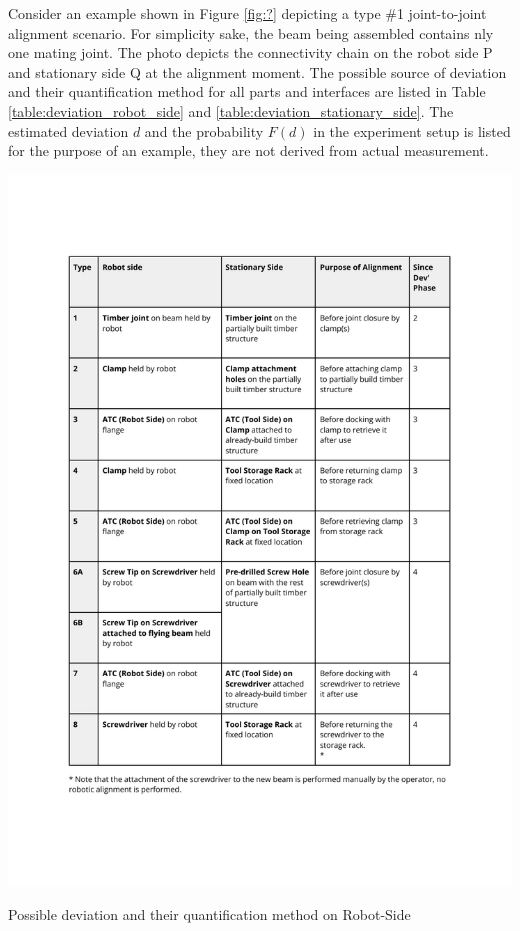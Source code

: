 

Consider an example shown in Figure \ref{fig:?} depicting a type \#1 joint-to-joint alignment scenario. For simplicity sake, the beam being assembled contains nly one mating joint. The photo depicts the connectivity chain on the robot side P and stationary side Q at the alignment moment. The possible source of deviation and their quantification method for all parts and interfaces are listed in Table \ref{table:deviation_robot_side} and \ref{table:deviation_stationary_side}. The estimated deviation $d$ and the probability $F(d)$ in the experiment setup is listed for the purpose of an example, they are not derived from actual measurement.


\begin{table}
    \includegraphics[page=3, trim=25.4mm 30mm 25.4mm 33mm, clip, width=\textwidth]{tables/Tables in Chapter 9 to 11.pdf}
    \caption{Possible deviation and their quantification method on Robot-Side}
    \label{table:deviation_robot_side}
\end{table}

